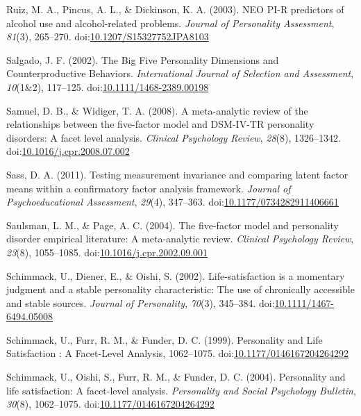 \documentclass[,man,floatsintext]{apa6}
\begin{document}
\hypertarget{ref-Ruiz2003}{}
Ruiz, M. A., Pincus, A. L., \& Dickinson, K. A. (2003). NEO PI-R
predictors of alcohol use and alcohol-related problems. \emph{Journal of
Personality Assessment}, \emph{81}(3), 265--270.
doi:\href{https://doi.org/10.1207/S15327752JPA8103}{10.1207/S15327752JPA8103}

\hypertarget{ref-Salgado2002}{}
Salgado, J. F. (2002). The Big Five Personality Dimensions and
Counterproductive Behaviors. \emph{International Journal of Selection
and Assessment}, \emph{10}(1\&2), 117--125.
doi:\href{https://doi.org/10.1111/1468-2389.00198}{10.1111/1468-2389.00198}

\hypertarget{ref-SamuelWidiger2008}{}
Samuel, D. B., \& Widiger, T. A. (2008). A meta-analytic review of the
relationships between the five-factor model and DSM-IV-TR personality
disorders: A facet level analysis. \emph{Clinical Psychology Review},
\emph{28}(8), 1326--1342.
doi:\href{https://doi.org/10.1016/j.cpr.2008.07.002}{10.1016/j.cpr.2008.07.002}

\hypertarget{ref-Sass2011}{}
Sass, D. A. (2011). Testing measurement invariance and comparing latent
factor means within a confirmatory factor analysis framework.
\emph{Journal of Psychoeducational Assessment}, \emph{29}(4), 347--363.
doi:\href{https://doi.org/10.1177/0734282911406661}{10.1177/0734282911406661}

\hypertarget{ref-SaulsmanPage2004}{}
Saulsman, L. M., \& Page, A. C. (2004). The five-factor model and
personality disorder empirical literature: A meta-analytic review.
\emph{Clinical Psychology Review}, \emph{23}(8), 1055--1085.
doi:\href{https://doi.org/10.1016/j.cpr.2002.09.001}{10.1016/j.cpr.2002.09.001}

\hypertarget{ref-Schimmack2002}{}
Schimmack, U., Diener, E., \& Oishi, S. (2002). Life-satisfaction is a
momentary judgment and a stable personality characteristic: The use of
chronically accessible and stable sources. \emph{Journal of
Personality}, \emph{70}(3), 345--384.
doi:\href{https://doi.org/10.1111/1467-6494.05008}{10.1111/1467-6494.05008}

\hypertarget{ref-Schimmack1999}{}
Schimmack, U., Furr, R. M., \& Funder, D. C. (1999). Personality and
Life Satisfaction : A Facet-Level Analysis, 1062--1075.
doi:\href{https://doi.org/10.1177/0146167204264292}{10.1177/0146167204264292}

\hypertarget{ref-Schimmack2004}{}
Schimmack, U., Oishi, S., Furr, R. M., \& Funder, D. C. (2004).
Personality and life satisfaction: A facet-level analysis.
\emph{Personality and Social Psychology Bulletin}, \emph{30}(8),
1062--1075.
doi:\href{https://doi.org/10.1177/0146167204264292}{10.1177/0146167204264292}
\end{document}
